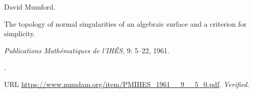 David Mumford.

\newblock The topology of normal singularities of an algebraic surface and a
  criterion for simplicity.

\newblock \emph{Publications Mathématiques de l'IHÉS}, 9: 5--22,
  1961.

\newblock {}.

\newblock URL \url{https://www.numdam.org/item/PMIHES_1961__9__5_0.pdf}.
\newblock \emph{Verified}.

